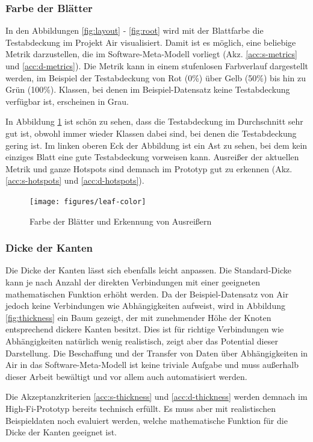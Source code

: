 \subsubsection*{Farbe der Blätter}

In den Abbildungen \ref{fig:layout} - \ref{fig:root} wird mit der Blattfarbe die Testabdeckung im Projekt Air visualisiert. Damit ist es möglich, eine beliebige Metrik darzustellen, die im Software-Meta-Modell vorliegt (Akz. \ref{acc:s-metrics} und \ref{acc:d-metrics}). Die Metrik kann in einem stufenlosen Farbverlauf dargestellt werden, im Beispiel der Testabdeckung von Rot (0\%) über Gelb (50\%) bis hin zu Grün (100\%). Klassen, bei denen im Beispiel-Datensatz keine Testabdeckung verfügbar ist, erscheinen in Grau.

In Abbildung \ref{fig:leaf-color} ist schön zu sehen, dass die Testabdeckung im Durchschnitt sehr gut ist, obwohl immer wieder Klassen dabei sind, bei denen die Testabdeckung gering ist. Im linken oberen Eck der Abbildung ist ein Ast zu sehen, bei dem kein einziges Blatt eine gute Testabdeckung vorweisen kann. Ausreißer der aktuellen Metrik und ganze Hotspots sind demnach im Prototyp gut zu erkennen (Akz. \ref{acc:s-hotspots} und \ref{acc:d-hotspots}).

\begin{figure}[htb]
  \texttt{[image: figures/leaf-color]}
  \caption{Farbe der Blätter und Erkennung von Ausreißern}
  \label{fig:leaf-color}
\end{figure}

\subsubsection*{Dicke der Kanten}

Die Dicke der Kanten lässt sich ebenfalls leicht anpassen. Die Standard-Dicke kann je nach Anzahl der direkten Verbindungen mit einer geeigneten mathematischen Funktion erhöht werden. Da der Beispiel-Datensatz von Air jedoch keine Verbindungen wie Abhängigkeiten aufweist, wird in Abbildung \ref{fig:thickness} ein Baum gezeigt, der mit zunehmender Höhe der Knoten entsprechend dickere Kanten besitzt. Dies ist für richtige Verbindungen wie Abhängigkeiten natürlich wenig realistisch, zeigt aber das Potential dieser Darstellung. Die Beschaffung und der Transfer von Daten über Abhängigkeiten in Air in das Software-Meta-Modell ist keine triviale Aufgabe und muss außerhalb dieser Arbeit bewältigt und vor allem auch automatisiert werden.

Die Akzeptanzkriterien \ref{acc:s-thickness} und \ref{acc:d-thickness} werden demnach im High-Fi-Prototyp bereits technisch erfüllt. Es muss aber mit realistischen Beispieldaten noch evaluiert werden, welche mathematische Funktion für die Dicke der Kanten geeignet ist.

